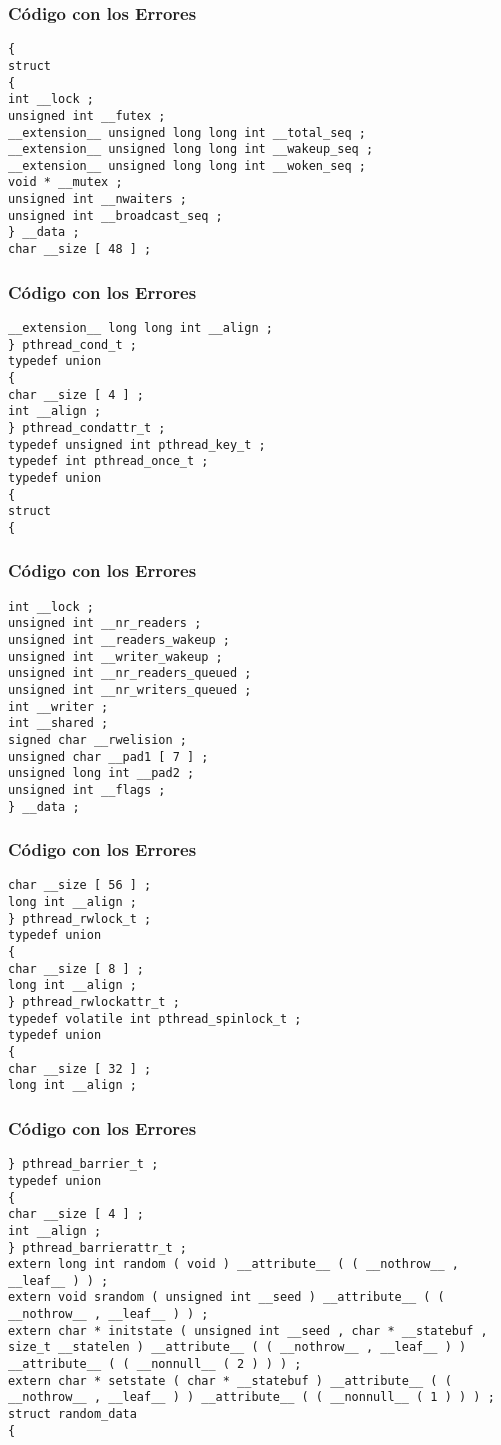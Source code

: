 \documentclass{beamer}
\begin{document}
\begin{frame}[fragile]
\frametitle{C\'odigo con los Errores}
\begin{lstlisting}[style=CStyle]
{ 
struct 
{ 
int __lock ; 
unsigned int __futex ; 
__extension__ unsigned long long int __total_seq ; 
__extension__ unsigned long long int __wakeup_seq ; 
__extension__ unsigned long long int __woken_seq ; 
void * __mutex ; 
unsigned int __nwaiters ; 
unsigned int __broadcast_seq ; 
} __data ; 
char __size [ 48 ] ; 
\end{lstlisting}
\end{frame}
\begin{frame}[fragile]
\frametitle{C\'odigo con los Errores}
\begin{lstlisting}[style=CStyle]
__extension__ long long int __align ; 
} pthread_cond_t ; 
typedef union 
{ 
char __size [ 4 ] ; 
int __align ; 
} pthread_condattr_t ; 
typedef unsigned int pthread_key_t ; 
typedef int pthread_once_t ; 
typedef union 
{ 
struct 
{ 
\end{lstlisting}
\end{frame}
\begin{frame}[fragile]
\frametitle{C\'odigo con los Errores}
\begin{lstlisting}[style=CStyle]
int __lock ; 
unsigned int __nr_readers ; 
unsigned int __readers_wakeup ; 
unsigned int __writer_wakeup ; 
unsigned int __nr_readers_queued ; 
unsigned int __nr_writers_queued ; 
int __writer ; 
int __shared ; 
signed char __rwelision ; 
unsigned char __pad1 [ 7 ] ; 
unsigned long int __pad2 ; 
unsigned int __flags ; 
} __data ; 
\end{lstlisting}
\end{frame}
\begin{frame}[fragile]
\frametitle{C\'odigo con los Errores}
\begin{lstlisting}[style=CStyle]
char __size [ 56 ] ; 
long int __align ; 
} pthread_rwlock_t ; 
typedef union 
{ 
char __size [ 8 ] ; 
long int __align ; 
} pthread_rwlockattr_t ; 
typedef volatile int pthread_spinlock_t ; 
typedef union 
{ 
char __size [ 32 ] ; 
long int __align ; 
\end{lstlisting}
\end{frame}
\begin{frame}[fragile]
\frametitle{C\'odigo con los Errores}
\begin{lstlisting}[style=CStyle]
} pthread_barrier_t ; 
typedef union 
{ 
char __size [ 4 ] ; 
int __align ; 
} pthread_barrierattr_t ; 
extern long int random ( void ) __attribute__ ( ( __nothrow__ , __leaf__ ) ) ; 
extern void srandom ( unsigned int __seed ) __attribute__ ( ( __nothrow__ , __leaf__ ) ) ; 
extern char * initstate ( unsigned int __seed , char * __statebuf , 
size_t __statelen ) __attribute__ ( ( __nothrow__ , __leaf__ ) ) __attribute__ ( ( __nonnull__ ( 2 ) ) ) ; 
extern char * setstate ( char * __statebuf ) __attribute__ ( ( __nothrow__ , __leaf__ ) ) __attribute__ ( ( __nonnull__ ( 1 ) ) ) ; 
struct random_data 
{ 
\end{lstlisting}
\end{frame}
\end{document}

